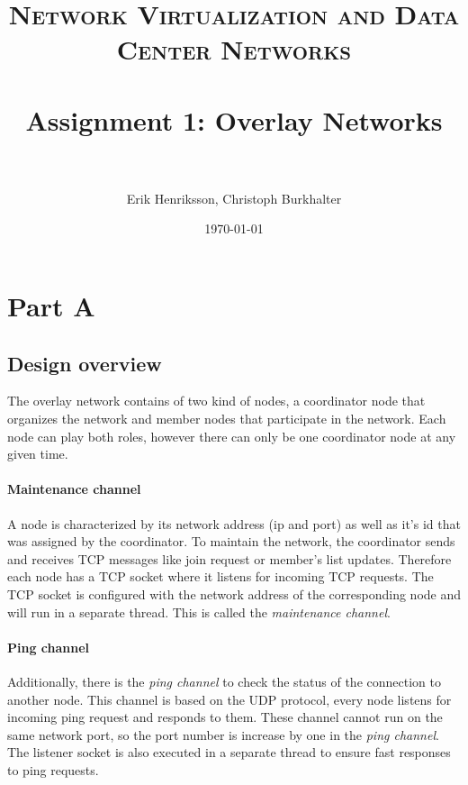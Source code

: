 \documentclass[paper=a4, fontsize=11pt]{scrartcl} %
\title{	
\normalfont \normalsize 
\textsc{Network Virtualization and Data Center Networks} \\ [25pt] %
\horrule{0.5pt} \\[0.4cm] %
\huge Assignment 1: Overlay Networks \\ %
\horrule{2pt} \\[0.5cm] %
}
\author{Erik Henriksson, Christoph Burkhalter} %
\date{\normalsize\today} %
\numberwithin{equation}{section} %
\numberwithin{figure}{section} %
\numberwithin{table}{section} %
\begin{document}
\maketitle %


\section{Part A}


\subsection{Design overview}

The overlay network contains of two kind of nodes, a coordinator node that organizes the network and member nodes that participate in the network. Each node can play both roles, however there can only be one coordinator node at any given time.

\paragraph{Maintenance channel}

A node is characterized by its network address (ip and port) as well as it's id that was assigned by the coordinator. To maintain the network, the coordinator sends and receives TCP messages like join request or member's list updates. Therefore each node has a TCP socket where it listens for incoming TCP requests. The TCP socket is configured with the network address of the corresponding node and will run in a separate thread. This is called the \textit{maintenance channel}. 

\paragraph{Ping channel}

Additionally, there is the \textit{ping channel} to check the status of the connection to another node. This channel is based on the UDP protocol, every node listens for incoming ping request and responds to them. These channel cannot run on the same network port, so the port number is increase by one in the \textit{ping channel}. The listener socket is also executed in a separate thread to ensure fast responses to ping requests.
\end{document}
